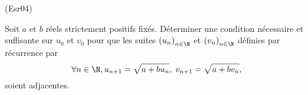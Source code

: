 \begin{tiny}(Esr04)\end{tiny} Soit $a$ et $b$ réels strictement positifs fixés. Déterminer une condition nécessaire et suffisante sur $u_0$ et $v_0$ pour que les suites $\left( u_n \right)_{n \in \N}$ et $\left( v_n \right)_{n \in \N}$ définies par récurrence par
\[
 \forall n \in \N, u_{n+1} = \sqrt{a + bu_n},\;  v_{n+1} = \sqrt{a + bv_n},
\]
soient adjacentes.